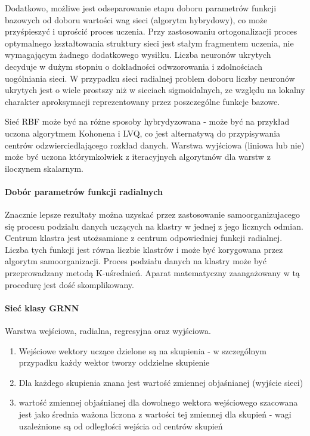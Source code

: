 Dodatkowo, możliwe jest odseparowanie etapu doboru parametrów funkcji 
bazowych od doboru wartości wag sieci (algorytm hybrydowy), co może 
przyśpieszyć i uprościć proces uczenia. Przy zastosowaniu ortogonalizacji 
proces optymalnego kształtowania struktury sieci jest stałym fragmentem 
uczenia, nie wymagającym żadnego dodatkowego wysiłku. 
Liczba neuronów ukrytych decyduje w dużym stopniu o dokładności 
odwzorowania i zdolnościach uogólniania sieci. W przypadku sieci 
radialnej problem doboru liczby neuronów ukrytych jest o wiele prostszy 
niż w sieciach sigmoidalnych, ze względu na lokalny charakter 
aproksymacji reprezentowany przez poszczególne funkcje bazowe. 

Sieć RBF może być na różne sposoby hybrydyzowana -
może być na przykład uczona algorytmem Kohonena i LVQ, co jest 
alternatywą do przypisywania centrów odzwierciedlającego rozkład 
danych. Warstwa wyjściowa (liniowa lub nie) może być uczona 
którymkolwiek z iteracyjnych algorytmów dla warstw z iloczynem 
skalarnym.

\paragraph{Dobór parametrów funkcji radialnych}

Znacznie lepsze rezultaty można uzyskać przez zastosowanie 
samoorganizujacego się procesu podziału danych uczących
na klastry w jednej z jego licznych odmian. 
Centrum klastra jest utożsamiane z centrum odpowiedniej funkcji radialnej. 
Liczba tych funkcji jest równa liczbie klastrów i może być korygowana przez 
algorytm samoorganizacji. 
Proces podziału danych na klastry może być przeprowadzany metodą
K-uśrednień. Aparat matematyczny zaangażowany w tą procedurę jest dość
skomplikowany.

\paragraph{Sieć klasy GRNN}

Warstwa wejściowa, radialna, regresyjna oraz wyjściowa.
\begin{enumerate}
 \item Wejściowe wektory uczące dzielone są na 
skupienia - w szczególnym przypadku każdy 
wektor tworzy oddzielne skupienie
 \item Dla każdego skupienia znana jest wartość
zmiennej objaśnianej (wyjście sieci)
 \item wartość zmiennej objaśnianej dla dowolnego 
wektora wejściowego szacowana jest jako 
średnia ważona liczona z wartości tej 
zmiennej dla skupień - wagi uzależnione są
od odległości wejścia od centrów skupień
\end{enumerate}